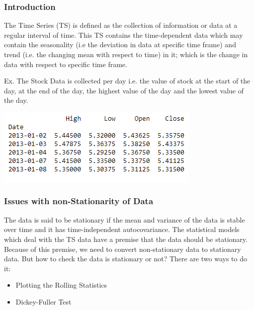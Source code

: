 	\subsubsection{Introduction}
		The Time Series (TS) is defined as the collection of information or data at a regular interval of time. This TS contains the time-dependent data which may contain the seasonality (i.e the deviation in data at specific time frame) and trend (i.e. the changing mean with respect to time) in it; which is the change in data with respect to specific time frame.

		Ex. The Stock Data is collected per day i.e. the value of stock at the start of the day, at the end of the day, the highest value of the day and the lowest value of the day.

		\begin{center}
		\includegraphics[width=\linewidth]{figures/Ex_of_Time_Series_data_of_a_stock.jpg}	
		\label{fig: Example of Time Series data of a stock price}
		\end{center}


	
	\subsubsection{Issues with non-Stationarity of Data}
	
		The data is said to be stationary if the mean and variance of the data is stable over time and it has time-independent autocovariance. The statistical models which deal with the TS data have a premise that the data should be stationary. Because of this premise, we need to convert non-stationary data to stationary data. But how to check the data is stationary or not? There are two ways to do it:
		\begin{itemize}
		
			\item Plotting the Rolling Statistics
			
			\item Dickey-Fuller Test

		\end{itemize}
		
